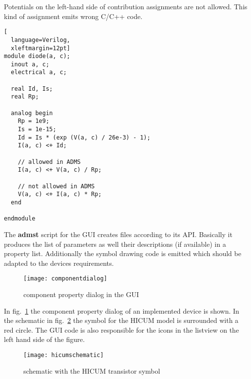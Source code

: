 
Potentials on the left-hand side of contribution assignments are not
allowed.  This kind of assignment emits wrong C/C++ code.

\begin{lstlisting}[
  language=Verilog,
  xleftmargin=12pt]
module diode(a, c);  
  inout a, c;
  electrical a, c;

  real Id, Is;
  real Rp;

  analog begin
    Rp = 1e9;
    Is = 1e-15;
    Id = Is * (exp (V(a, c) / 26e-3) - 1);
    I(a, c) <+ Id;

    // allowed in ADMS
    I(a, c) <+ V(a, c) / Rp;

    // not allowed in ADMS
    V(a, c) <+ I(a, c) * Rp;
  end

endmodule
\end{lstlisting}


The \textbf{admst} script for the GUI creates files according to its
API.  Basically it produces the list of parameters as well their
descriptions (if available) in a property list.  Additionally the
symbol drawing code is emitted which should be adapted to the devices
requirements.

\begin{figure}[ht]
\begin{center}
\texttt{[image: componentdialog]}
\end{center}
\caption{component property dialog in the GUI}
\label{fig:componentdialog}
\end{figure}
\FloatBarrier

In fig.~\ref{fig:componentdialog} the component property dialog of an
implemented device is shown.  In the schematic in
fig.~\ref{fig:hicumschematic} the symbol for the HICUM model is
surrounded with a red circle.  The GUI code is also responsible for
the icons in the listview on the left hand side of the figure.

\begin{figure}[ht]
\begin{center}
\texttt{[image: hicumschematic]}
\end{center}
\caption{schematic with the HICUM transistor symbol}
\label{fig:hicumschematic}
\end{figure}
\FloatBarrier



